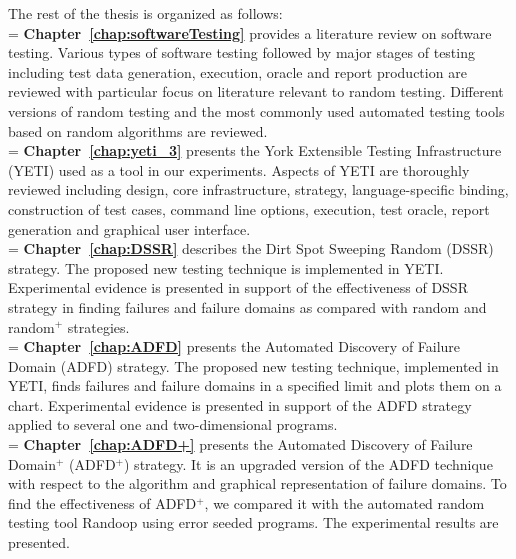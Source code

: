 The rest of the thesis is organized as follows:\\

\hangindent=\parindent
{}
\noindent
\textbf{Chapter~\ref{chap:softwareTesting}} provides a literature review on software testing. Various types of software testing followed by major stages of testing including test data generation, execution, oracle and report production are reviewed with particular focus on literature relevant to random testing. Different versions of random testing and the most commonly used automated testing tools based on random algorithms are reviewed. \\


\hangindent=\parindent
{}
\noindent
\textbf{Chapter~\ref{chap:yeti_3}} presents the York Extensible Testing Infrastructure (YETI) used as a tool in our experiments. Aspects of YETI are thoroughly reviewed including design, core infrastructure, strategy, language-specific binding, construction of test cases, command line options, execution, test oracle, report generation and graphical user interface.\\

\hangindent=\parindent
{}
\noindent
\textbf{Chapter~\ref{chap:DSSR}} describes the Dirt Spot Sweeping Random (DSSR) strategy. The proposed new testing technique is implemented in YETI. Experimental evidence is presented in support of the effectiveness of DSSR strategy in finding failures and failure domains as compared with random and random$^+$ strategies. \\

\hangindent=\parindent
{}
\noindent
\textbf{Chapter~\ref{chap:ADFD}} presents the Automated Discovery of Failure Domain (ADFD) strategy. The proposed new testing technique, implemented in YETI, finds failures and failure domains in a specified limit and plots them on a chart. Experimental evidence is presented in support of the ADFD strategy applied to several one and two-dimensional programs. \\

 
\hangindent=\parindent
{}
\noindent
\textbf{Chapter~\ref{chap:ADFD+}} presents the Automated Discovery of Failure Domain$^+$ (ADFD$^+$) strategy. It is an upgraded version of the ADFD technique with respect to the algorithm and graphical representation of failure domains. To find the effectiveness of ADFD$^+$, we compared it with the automated random testing tool Randoop using error seeded programs. The experimental results are presented.\\ 


